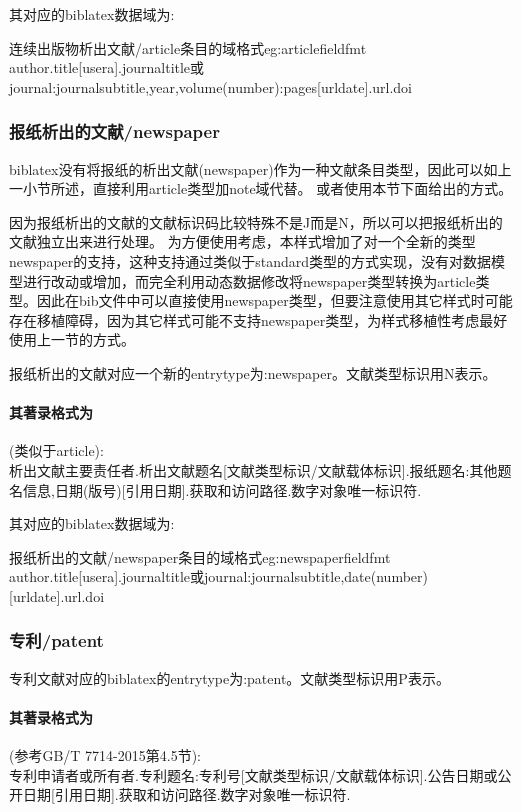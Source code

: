 其对应的biblatex数据域为:
\begin{codetex}{连续出版物析出文献/article条目的域格式}{eg:articlefieldfmt}
author.title[usera].journaltitle或journal:journalsubtitle,year,volume(number):pages[urldate].url.doi
\end{codetex}


\subsubsection{报纸析出的文献/newspaper}\label{sec:standard}
biblatex没有将报纸的析出文献(newspaper)作为一种文献条目类型，因此可以如上一小节所述，直接利用article类型加note域代替。
或者使用本节下面给出的方式。

因为报纸析出的文献的文献标识码比较特殊不是J而是N，所以可以把报纸析出的文献独立出来进行处理。
为方便使用考虑，本样式增加了对一个全新的类型newspaper的支持，这种支持通过类似于standard类型的方式实现，没有对数据模型进行改动或增加，而完全利用动态数据修改将newspaper类型转换为article类型。因此在bib文件中可以直接使用newspaper类型，但要注意使用其它样式时可能存在移植障碍，因为其它样式可能不支持newspaper类型，为样式移植性考虑最好使用上一节的方式。

\begin{refentry}{}{}
报纸析出的文献对应一个新的entrytype为:newspaper。文献类型标识用N表示。

\paragraph{其著录格式为}(类似于article):\\
析出文献主要责任者.析出文献题名[文献类型标识/文献载体标识].报纸题名:其他题名信息,日期(版号)[引用日期].获取和访问路径.数字对象唯一标识符.
\end{refentry}

其对应的biblatex数据域为:
\begin{codetex}{报纸析出的文献/newspaper条目的域格式}{eg:newspaperfieldfmt}
author.title[usera].journaltitle或journal:journalsubtitle,date(number)[urldate].url.doi
\end{codetex}

\subsubsection{专利/patent}
\begin{refentry}{}{}
专利文献对应的biblatex的entrytype为:patent。文献类型标识用P表示。

\paragraph{其著录格式为}(参考GB/T 7714-2015第4.5节):\\
专利申请者或所有者.专利题名:专利号[文献类型标识/文献载体标识].公告日期或公开日期[引用日期].获取和访问路径.数字对象唯一标识符.
\end{refentry}

